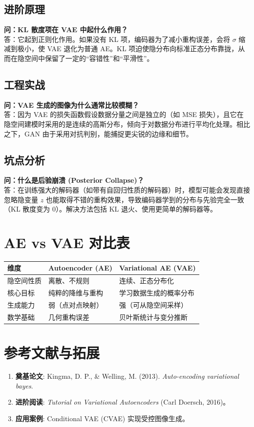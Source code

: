 \documentclass[12pt, a4paper]{book}
\begin{document}
\subsection{进阶原理}
\textbf{问：KL 散度项在 VAE 中起什么作用？}\\
答：它起到正则化作用。如果没有 KL 项，编码器为了减小重构误差，会将 $\sigma$ 缩减到极小，使 VAE 退化为普通 AE。KL 项迫使隐分布向标准正态分布靠拢，从而在隐空间中保留了一定的“容错性”和“平滑性”。

\subsection{工程实战}
\textbf{问：VAE 生成的图像为什么通常比较模糊？}\\
答：因为 VAE 的损失函数假设数据分量之间是独立的（如 MSE 损失），且它在隐空间建模时采用的是连续的高斯分布，倾向于对数据分布进行平均化处理。相比之下，GAN 由于采用对抗判别，能捕捉更尖锐的边缘和细节。

\subsection{坑点分析}
\textbf{问：什么是后验崩溃 (Posterior Collapse)？}\\
答：在训练强大的解码器（如带有自回归性质的解码器）时，模型可能会发现直接忽略隐变量 $z$ 也能取得不错的重构效果，导致编码器学到的分布与先验完全一致（KL 散度变为 0）。解决方法包括 KL 退火、使用更简单的解码器等。

\section{AE vs VAE 对比表}

\begin{table}[h]
\centering
\begin{tabularx}{\textwidth}{|l|X|X|}
\hline
\textbf{维度} & \textbf{Autoencoder (AE)} & \textbf{Variational AE (VAE)} \\
\hline
隐空间性质 & 离散、不规则 & 连续、正态分布化 \\
\hline
核心目标 & 纯粹的降维与重构 & 学习数据生成的概率分布 \\
\hline
生成能力 & 弱（点对点映射） & 强（可从隐空间采样） \\
\hline
数学基础 & 几何重构误差 & 贝叶斯统计与变分推断 \\
\hline
\end{tabularx}
\end{table}

\section{参考文献与拓展}
\begin{enumerate}
    \item \textbf{奠基论文}: Kingma, D. P., & Welling, M. (2013). \textit{Auto-encoding variational bayes}.
    \item \textbf{进阶阅读}: \textit{Tutorial on Variational Autoencoders} (Carl Doersch, 2016)。
    \item \textbf{应用案例}: Conditional VAE (CVAE) 实现受控图像生成。
\end{enumerate}
\end{document}

